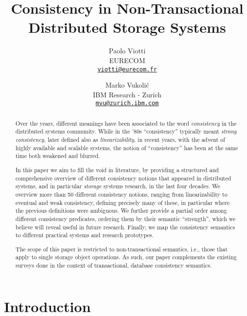 \documentclass[letter, 11pt]{article}
\begin{document}
\title{Consistency in Non-Transactional \\ Distributed Storage Systems}

\author{
  Paolo Viotti\\
  EURECOM \\
  \texttt{\href{mailto:viotti@eurecom.fr}{viotti@eurecom.fr}}
  \and
  Marko Vukoli\'c\\
  IBM Research - Zurich \\
  \texttt{\href{mailto:mvu@zurich.ibm.com}{mvu@zurich.ibm.com}}
}

\date{}


\maketitle
\thispagestyle{empty}
\begin{abstract}
Over the years, different meanings have been associated to the word \emph{consistency}
in the distributed systems community.  While in the '80s ``consistency'' typically meant \emph{strong consistency}, later defined also as \emph{linearizability}, in recent years, with the advent of highly available and scalable systems, the notion of ``consistency'' has been at the same time both weakened and blurred. 

In this paper we aim to fill the void in literature, by providing a structured and comprehensive overview of different consistency notions that appeared in distributed systems, and in particular \emph{storage} systems research, in the last four decades. We overview more than 50 different consistency notions, ranging from linearizability to eventual and weak consistency, defining precisely many of these, in particular where the previous definitions were ambiguous. We further provide a partial order among different consistency predicates, ordering them by their semantic ``strength'', which we believe will reveal useful in future research. Finally, we map the consistency semantics to different practical systems and research prototypes.

The scope of this paper is restricted to non-transactional semantics, i.e., those that apply to single storage object operations. As such, our paper complements the existing surveys done in the context of transactional, database consistency semantics. 
\end{abstract}



\newpage
\setcounter{page}{1}

\section{Introduction}
\end{document}
